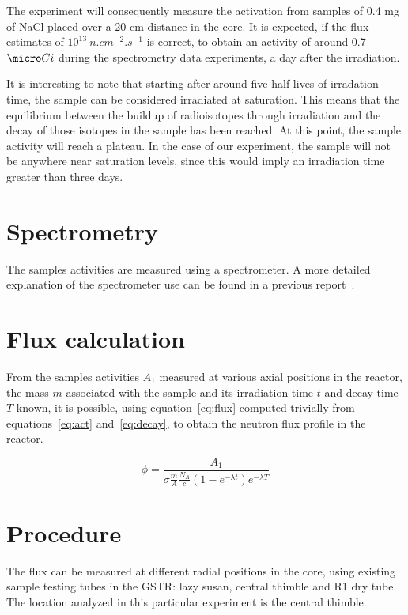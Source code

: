 The experiment will consequently measure the activation from samples of 0.4 mg of NaCl placed over a 20 cm distance in the core. It is expected, if the flux estimates of $10^{13}\ n.cm^{-2}.s^{-1}$ is correct, to obtain an activity of around 0.7 $\micro Ci$ during the spectrometry data experiments, a day after the irradiation.

It is interesting to note that starting after around five half-lives of irradation time, the sample can be considered irradiated at saturation. This means that the equilibrium between the buildup of radioisotopes through irradiation and the decay of those isotopes in the sample has been reached. At this point, the sample activity will reach a plateau. In the case of our experiment, the sample will not be anywhere near saturation levels, since this would imply an irradiation time greater than three days.

\section{Spectrometry}
The samples activities are measured using a spectrometer. A more detailed explanation of the spectrometer use can be found in a previous report~\cite{glher01}.


\section{Flux calculation}

From the samples activities $A_1$ measured at various axial positions in the reactor, the mass $m$ associated with the sample and its irradiation time $t$ and decay time $T$ known, it is possible, using equation~\ref{eq:flux} computed trivially from equations~\ref{eq:act} and~\ref{eq:decay}, to obtain the neutron flux profile in the reactor.

\begin{equation}
\phi = \frac{A_1}{\sigma \frac{m}{A} \frac{N_A}{c} (1-e^{-\lambda t}) e^{-\lambda T}}
\label{eq:flux}
\end{equation}

\section{Procedure}
The flux can be measured at different radial positions in the core, using existing sample testing tubes in the GSTR: lazy susan, central thimble and R1 dry tube. The location analyzed in this particular experiment is the central thimble.

